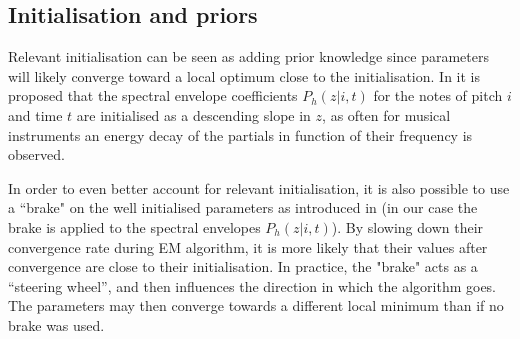 \documentclass{article}
\begin{document}


\subsection{Initialisation and priors}
\label{sec:init-prior}

Relevant initialisation can be seen as adding prior knowledge since parameters will likely converge toward a local optimum close to the initialisation.
In \cite{Fuentes2013_PhD} it is proposed that the spectral envelope coefficients $P_h(z|i,t)$ for the notes of pitch $i$ and time $t$ are initialised as a descending slope in $z$, as often for musical instruments an energy decay of the partials in function of their frequency is observed.

\vspace{0.1cm}

In order to even better account for relevant initialisation, it is also possible to use a ``brake" on the well initialised parameters as introduced in \cite{Fuentes_EUSCIPCO2014} (in our case the brake is applied to the spectral envelopes $P_h(z|i,t)$). By slowing down their convergence rate during EM algorithm, it is more likely that their values after convergence are close to their initialisation. In practice, the "brake" acts as a “steering wheel”, and then influences the direction in which the algorithm goes. The parameters may then converge towards a different local minimum than if no brake was used.

\vspace{0.1cm}
\end{document}
